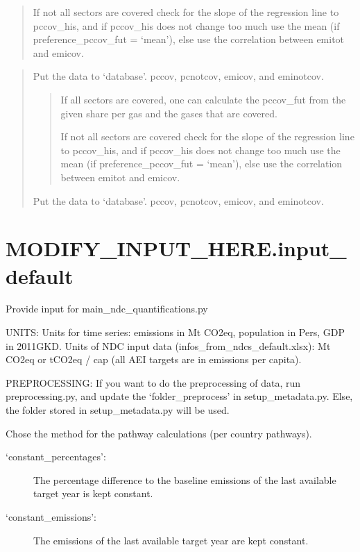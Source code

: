 \documentclass[letterpaper,10pt,english]{sphinxmanual}
\begin{document}
\begin{quote}

If not all sectors are covered check for the slope of the regression line to pccov\_his,
and if pccov\_his does not change too much use the mean (if preference\_pccov\_fut = ‘mean’),
else use the correlation between emitot and emicov.
\end{quote}

\begin{quote}

Put the data to ‘database’.
pccov, pcnotcov, emicov, and eminotcov.
\begin{quote}

If all sectors are covered, one can calculate the pccov\_fut from the given share per gas
and the gases that are covered.

If not all sectors are covered check for the slope of the regression line to pccov\_his,
and if pccov\_his does not change too much use the mean (if preference\_pccov\_fut = ‘mean’),
else use the correlation between emitot and emicov.
\end{quote}

Put the data to ‘database’.
pccov, pcnotcov, emicov, and eminotcov.
\end{quote}


\chapter{MODIFY\_INPUT\_HERE.input\_default}
\label{\detokenize{code:modify-input-here-input-default}}
Provide input for main\_ndc\_quantifications.py

UNITS:
Units for time series: emissions in Mt CO2eq, population in Pers, GDP in 2011GKD.
Units of NDC input data (infos\_from\_ndcs\_default.xlsx): Mt CO2eq or tCO2eq / cap (all AEI targets are in emissions per capita).

PREPROCESSING:
If you want to do the preprocessing of data, run preprocessing.py, and update the ‘folder\_preprocess’ in setup\_metadata.py.
Else, the folder stored in setup\_metadata.py will be used.

Chose the method for the pathway calculations (per country pathways).
\begin{description}
\item[{‘constant\_percentages’:}] \leavevmode
The percentage difference to the baseline emissions of the last available target year
is kept constant.

\item[{‘constant\_emissions’:}] \leavevmode
The emissions of the last available target year are kept constant.

\end{description}
\end{document}
